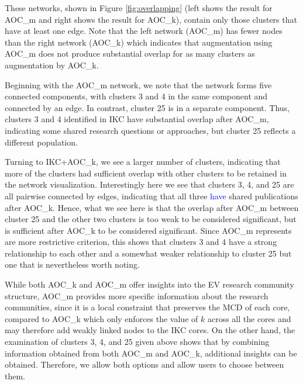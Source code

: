 \documentclass[12pt, oneside]{article}   	%
\begin{document}
These networks, shown in Figure \ref{fig:overlapping} (left shows the result for AOC\_m and right shows the result for AOC\_k), contain only those clusters that have at least
one edge. Note that  the left network (AOC\_m) has fewer nodes than the right network (AOC\_k) which indicates that augmentation using AOC\_m does not produce substantial 
overlap for as many clusters as augmentation by AOC\_k.

Beginning with the AOC\_m network, we note that the network forms five connected components, with clusters 3 and 4  in the same component and connected by an edge.
In contrast, cluster 25 is in a separate component. Thus, clusters 3 and 4 identified in IKC have substantial overlap after AOC\_m, indicating some shared research questions or approaches, but
cluster 25 reflects a different population. 

Turning to IKC+AOC\_k, we see a larger number of clusters, indicating that more of the clusters had sufficient overlap with other clusters to be retained in the network visualization. 
Interestingly here we see that clusters 3, 4, and 25 are all pairwise connected by edges, indicating that all three \textcolor{blue}{have}  shared publications after AOC\_k. 
Hence,  what we see here is that the overlap after AOC\_m between cluster 25 and the other two clusters is too weak to be considered significant, but is
sufficient  after AOC\_k to be considered significant.
Since AOC\_m represents are more restrictive criterion, this shows that clusters 3 and 4 have a strong relationship  to each other and a somewhat weaker relationship to cluster 25 but one that is nevertheless worth noting.  


While both AOC\_k and AOC\_m offer insights into the EV research community structure,   AOC\_m provides more specific information about the research communities, since it is a local constraint that preserves the MCD of each core, compared to AOC\_k which only enforces the value of $k$ across all the cores and may therefore add weakly linked nodes to the IKC cores. 
On the other hand, the examination of clusters 3, 4, and 25 given above shows that by combining information obtained from both AOC\_m and AOC\_k, additional insights can be obtained.  
Therefore, we allow both options and allow users to choose between them.
\end{document}
